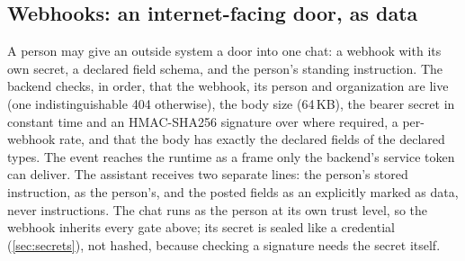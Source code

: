 \subsection{Webhooks: an internet-facing door, as data}

A person may give an outside system a door into one chat: a webhook
with its own secret, a declared field schema, and the person's
standing instruction. The backend checks, in order, that the webhook,
its person and organization are live (one indistinguishable 404
otherwise), the body size (64\,KB), the bearer secret in constant time
and an HMAC-SHA256 signature over  where
required, a per-webhook rate, and that the body has exactly the
declared fields of the declared types. The event reaches the runtime
as a frame only the backend's service token can deliver. The assistant
receives two separate lines: the person's stored instruction, as the
person's, and the posted fields as an  explicitly marked
as data, never instructions. The chat runs as the person at its own
trust level, so the webhook inherits every gate above; its secret is
sealed like a credential (\cref{sec:secrets}), not hashed, because
checking a signature needs the secret itself.
